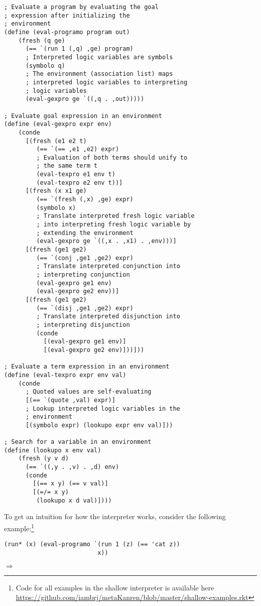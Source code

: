 \begin{Verbatim}
; Evaluate a program by evaluating the goal
; expression after initializing the
; environment
(define (eval-programo program out)
    (fresh (q ge)
      (== `(run 1 (,q) ,ge) program)
      ; Interpreted logic variables are symbols
      (symbolo q)
      ; The environment (association list) maps
      ; interpreted logic variables to interpreting
      ; logic variables
      (eval-gexpro ge `((,q . ,out)))))

; Evaluate goal expression in an environment
(define (eval-gexpro expr env)
    (conde
      [(fresh (e1 e2 t)
         (== `(== ,e1 ,e2) expr)
         ; Evaluation of both terms should unify to
         ; the same term t
         (eval-texpro e1 env t)
         (eval-texpro e2 env t))]
      [(fresh (x x1 ge)
         (== `(fresh (,x) ,ge) expr)
         (symbolo x)
         ; Translate interpreted fresh logic variable
         ; into interpreting fresh logic variable by
         ; extending the environment
         (eval-gexpro ge `((,x . ,x1) . ,env)))]
      [(fresh (ge1 ge2)
         (== `(conj ,ge1 ,ge2) expr)
         ; Translate interpreted conjunction into
         ; interpreting conjunction
         (eval-gexpro ge1 env)
         (eval-gexpro ge2 env))]
      [(fresh (ge1 ge2)
         (== `(disj ,ge1 ,ge2) expr)
         ; Translate interpreted disjunction into
         ; interpreting disjunction
         (conde
           [(eval-gexpro ge1 env)]
           [(eval-gexpro ge2 env)]))]))

; Evaluate a term expression in an environment
(define (eval-texpro expr env val)
    (conde
      ; Quoted values are self-evaluating
      [(== `(quote ,val) expr)]
      ; Lookup interpreted logic variables in the
      ; environment
      [(symbolo expr) (lookupo expr env val)]))

; Search for a variable in an environment
(define (lookupo x env val)
    (fresh (y v d)
      (== `((,y . ,v) . ,d) env)
      (conde
        [(== x y) (== v val)]
        [(=/= x y)
         (lookupo x d val)])))
\end{Verbatim}

To get an intuition for how the interpreter works, consider the following
example:\footnote{Code for all examples in the shallow interpreter is available
here
\url{https://github.com/iambrj/metaKanren/blob/master/shallow-examples.rkt}}

\begin{Verbatim}
(run* (x) (eval-programo `(run 1 (z) (== 'cat z))
                          x))
\end{Verbatim}
$\Rightarrow$

